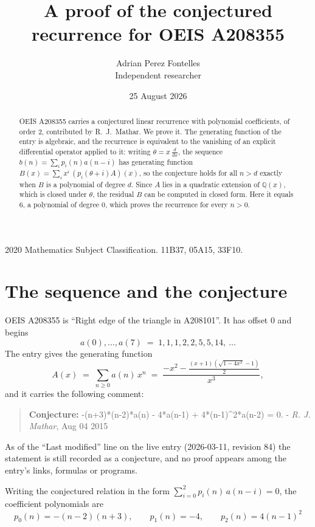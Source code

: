 \documentclass[11pt,a4paper]{article}
\title{A proof of the conjectured recurrence for OEIS A208355}
\author{Adrian Perez Fontelles\\ \small Independent researcher}
\date{25 August 2026}
\theoremstyle{plain}
\theoremstyle{definition}
\begin{document}
\maketitle

\begin{abstract}
OEIS A208355 carries a conjectured linear recurrence with polynomial coefficients, of
order 2, contributed by R.~J.~Mathar. We prove it. The generating function of the
entry is algebraic, and the recurrence is equivalent to the vanishing of an explicit
differential operator applied to it: writing $\theta=x\,\frac{d}{dx}$, the sequence
$b(n)=\sum_{i}p_{i}(n)a(n-i)$ has generating function
$B(x)=\sum_{i}x^{i}\,(p_{i}(\theta+i)A)(x)$, so the conjecture holds for all $n>d$ exactly
when $B$ is a polynomial of degree $d$. Since $A$ lies in a quadratic extension of
$\mathbb{Q}(x)$, which is closed under $\theta$, the residual $B$ can be computed in
closed form. Here it equals $6$, a polynomial of degree $0$, which proves
the recurrence for every $n>0$.
\end{abstract}

\noindent\small 2020 Mathematics Subject Classification. 11B37, 05A15, 33F10.\normalsize

\section{The sequence and the conjecture}

OEIS A208355 is ``Right edge of the triangle in A208101''. It has offset $0$ and begins
\[
a(0),\dots,a(7)\;=\;1, 1, 1, 2, 2, 5, 5, 14,\ \dots
\]
The entry gives the generating function
\begin{equation}\label{eq:gf}
A(x)\;=\;\sum_{n\ge 0} a(n)\,x^{n}\;=\;\frac{- x^{2} - \frac{\left(x + 1\right) \left(\sqrt{1 - 4 x^{2}} - 1\right)}{2}}{x^{3}} ,
\end{equation}
and it carries the following comment:
\begin{quote}\small
\textbf{Conjecture:} -(n+3)*(n-2)*a(n) - 4*a(n-1) + 4*(n-1)\^{}2*a(n-2) = 0. - \emph{R. J. Mathar}, Aug 04 2015
\end{quote}
As of the ``Last modified'' line on the live entry (2026-03-11, revision 84) the
statement is still recorded as a conjecture, and no proof appears among the entry's links,
formulas or programs.

Writing the conjectured relation in the form $\sum_{i=0}^{2}p_{i}(n)\,a(n-i)=0$,
the coefficient polynomials are
\[
p_{0}(n)=- \left(n - 2\right) \left(n + 3\right),\qquad p_{1}(n)=-4,\qquad p_{2}(n)=4 \left(n - 1\right)^{2}
\]
\end{document}
